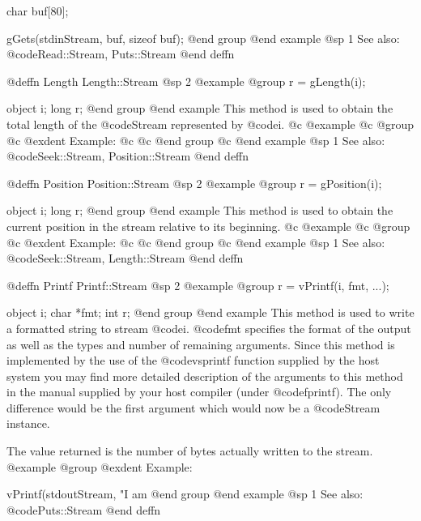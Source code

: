 char    buf[80];

gGets(stdinStream, buf, sizeof buf);
@end group
@end example
@sp 1
See also:  @code{Read::Stream, Puts::Stream}
@end deffn







@deffn {Length} Length::Stream
@sp 2
@example
@group
r = gLength(i);

object  i;
long    r;
@end group
@end example
This method is used to obtain the total length of the @code{Stream} represented
by @code{i}.
@c @example
@c @group
@c @exdent Example:
@c  
@c @end group
@c @end example
@sp 1
See also:  @code{Seek::Stream, Position::Stream}
@end deffn









@deffn {Position} Position::Stream
@sp 2
@example
@group
r = gPosition(i);

object  i;
long    r;
@end group
@end example
This method is used to obtain the current position in the stream
relative to its beginning.
@c @example
@c @group
@c @exdent Example:
@c  
@c @end group
@c @end example
@sp 1
See also:  @code{Seek::Stream, Length::Stream}
@end deffn








@deffn {Printf} Printf::Stream
@sp 2
@example
@group
r = vPrintf(i, fmt, ...);

object  i;
char    *fmt;
int     r;
@end group
@end example
This method is used to write a formatted string to stream @code{i}.
@code{fmt} specifies the format of the output as well as the types and
number of remaining arguments.  Since this method is implemented by the
use of the @code{vsprintf} function supplied by the host system you may
find more detailed description of the arguments to this method in the
manual supplied by your host compiler (under @code{fprintf}).  The only
difference would be the first argument which would now be a @code{Stream}
instance.

The value returned is the number of bytes actually written to the stream.
@example
@group
@exdent Example:
 
vPrintf(stdoutStream, "I am %
@end group
@end example
@sp 1
See also:  @code{Puts::Stream}
@end deffn







